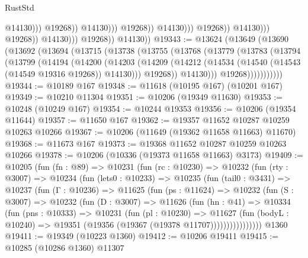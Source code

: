 \begin{lexlean}{RustStd}
\begin{coremodule}
                                                          @14130)))
                                                    @19268))
                                                @14130)))
                                          @19268))
                                      @14130)))
                                @19268))
                            @14130)))
                      @19268))
                  @14130)))
            @19268))
        @14130))
@19343 := @13624
    (@13649
      (@13690
        (@13692
          (@13694
            (@13715
              (@13738
                (@13755
                  (@13768
                    (@13779
                      (@13783
                        (@13794
                          (@13799
                            (@14194
                              (@14200
                                (@14203
                                  (@14209
                                    (@14212
                                      (@14534 (@14540 (@14543 (@14549 @19316 @19268)) @14130)))
                                    @19268))
                                @14130)))
                          @19268)))))))))))
@19344 := @10189 @167
@19348 := @11618 (@10195 @167) (@10201 @167)
@19349 := @10210 @11304
@19351 := @10206 (@19349 @11630)
@19353 := @10248 (@10249 @167)
@19354 := @10244 @19353
@19356 := @10206 (@19354 @11644)
@19357 := @11650 @167
@19362 := @19357 @11652 @10287 @10259 @10263 @10266
@19367 := @10206 (@11649 (@19362 @11658 @11663) @11670)
@19368 := @11673 @167
@19373 := @19368 @11652 @10287 @10259 @10263 @10266
@19378 := @10206 (@10336 (@19373 @11658 @11663) @3173)
@19409 := @10205
    (fun (fn : @89) =>
    @10231
      (fun (rc : @10230) =>
      @10232
        (fun (rty : @3007) =>
        @10234
          (fun (lets0 : @10233) =>
          @10235
            (fun (tail0 : @3431) =>
            @10237
              (fun (Γ : @10236) =>
              @11625
                (fun (ps : @11624) =>
                @10232
                  (fun (S : @3007) =>
                  @10232
                    (fun (D : @3007) =>
                    @11626
                      (fun (hn : @41) =>
                      @10334
                        (fun (pns : @10333) =>
                        @10231
                          (fun (pl : @10230) =>
                          @11627
                            (fun (bodyL : @10240) =>
                            @19351 (@19356 (@19367 (@19378 @11707))))))))))))))))
    @1360
@19411 := @19349 (@10223 @1360)
@19412 := @10206 @19411
@19415 := @10285 (@10286 @1360) @11307

\end{coremodule}
\end{lexlean}
